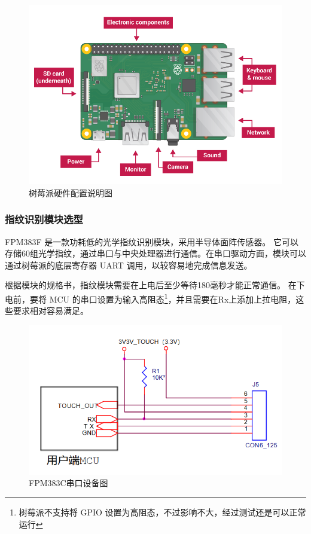 \begin{figure}[ht]
    \centering
    \caption{树莓派硬件配置说明图}    \label{树莓派硬件配置说明图}
    \includegraphics[width=\textwidth]{imgs/树莓派硬件配置说明图.png}
\end{figure}

\subsubsection{指纹识别模块选型}

FPM383F 是一款功耗低的光学指纹识别模块，采用半导体面阵传感器。
它可以存储60组光学指纹，通过串口与中央处理器进行通信。在串口驱动方面，模块可以通过树莓派的底层寄存器 UART 调用，以较容易地完成信息发送。

根据模块的规格书，指纹模块需要在上电后至少等待180毫秒才能正常通信。
在下电前，要将 MCU 的串口设置为输入高阻态\footnote{树莓派不支持将 GPIO 设置为高阻态，不过影响不大，经过测试还是可以正常运行}，并且需要在Rx上添加上拉电阻，这些要求相对容易满足。

\begin{figure}[ht]
    \centering
    \caption{FPM383C串口设备图}    \label{FPM383C串口设备图}
    \includegraphics[scale=0.6]{imgs/FPM383C串口设备图.png}
\end{figure}


